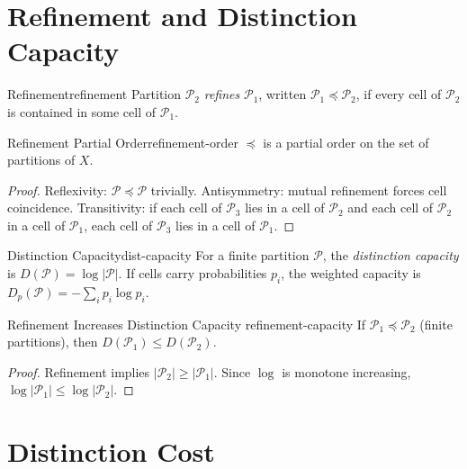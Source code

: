 \documentclass[12pt,twoside,openright]{book}
\newcommand{\partition}{\mathcal{P}}
\begin{document}
\section{Refinement and Distinction Capacity}
\label{sec:ch1-refinement}

\begin{definition}{Refinement}{refinement}
  Partition $\partition_2$ \emph{refines} $\partition_1$,
  written $\partition_1 \preceq \partition_2$, if every
  cell of $\partition_2$ is contained in some cell of
  $\partition_1$. 
\end{definition}

\begin{proposition}{Refinement Partial Order}{refinement-order}
  $\preceq$ is a partial order on the set of partitions
  of $X$.
\end{proposition}

\begin{proof}
  Reflexivity: $\partition \preceq \partition$ trivially.
  Antisymmetry: mutual refinement forces cell coincidence.
  Transitivity: if each cell of $\partition_3$ lies in a
  cell of $\partition_2$ and each cell of $\partition_2$
  in a cell of $\partition_1$, each cell of $\partition_3$
  lies in a cell of $\partition_1$.
\end{proof}

\begin{definition}{Distinction Capacity}{dist-capacity}
  For a finite partition $\partition$, the
  \emph{distinction capacity} is
  $D(\partition) = \log |\partition|$.
  If cells carry probabilities $p_i$, the weighted
  capacity is $D_p(\partition) = -\sum_i p_i \log p_i$.
\end{definition}

\begin{theorem}{Refinement Increases Distinction Capacity}%
  {refinement-capacity}
  If $\partition_1 \preceq \partition_2$ (finite
  partitions), then $D(\partition_1) \le D(\partition_2)$.
\end{theorem}

\begin{proof}
  Refinement implies $|\partition_2| \ge |\partition_1|$.
  Since $\log$ is monotone increasing,
  $\log|\partition_1| \le \log|\partition_2|$.
\end{proof}

\section{Distinction Cost}
\label{sec:ch1-cost}
\end{document}

